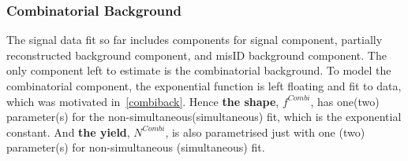 \subsubsection{Combinatorial Background}
The signal data fit so far includes components for signal component, partially reconstructed background component, and misID background component. The only component left to estimate is the combinatorial background. To model the combinatorial component, the exponential function is left floating and fit to data, which was motivated in~\autoref{combiback}. Hence \textbf{the shape}, $f^{Combi}$, has one(two) parameter(s) for the non-simultaneous(simultaneous) fit, which is the exponential constant. And \textbf{the yield}, $N^{Combi}$, is also parametrised just with one (two) parameter(s) for non-simultaneous (simultaneous) fit.

